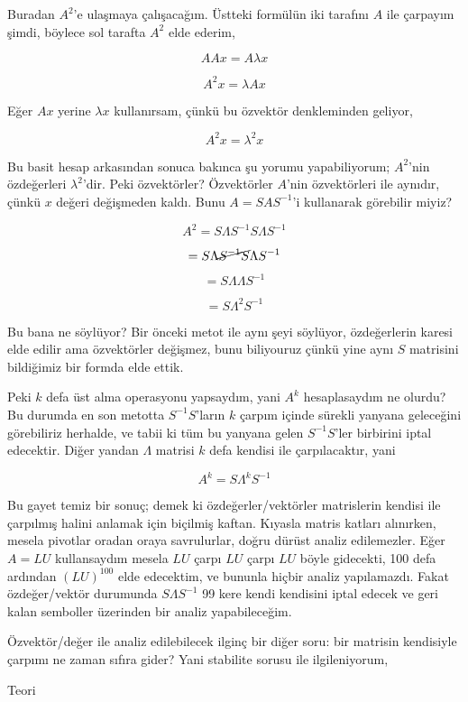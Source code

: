 \documentclass[12pt,fleqn]{article}\usepackage{../../common}
\begin{document}
Buradan $A^2$'e ulaşmaya çalışacağım. Üstteki formülün iki tarafını $A$ ile
çarpayım şimdi, böylece sol tarafta $A^2$ elde ederim,

$$ AAx = A\lambda x $$

$$ A^2x = \lambda A x $$

Eğer $Ax$ yerine $\lambda x$ kullanırsam, çünkü bu özvektör denkleminden geliyor,

$$ A^2x = \lambda^2 x $$

Bu basit hesap arkasından sonuca bakınca şu yorumu yapabiliyorum; $A^2$'nin
özdeğerleri $\lambda^2$'dir. Peki özvektörler? Özvektörler $A$'nin
özvektörleri ile aynıdır, çünkü $x$ değeri değişmeden kaldı. Bunu
$A=SAS^{-1}$'i kullanarak görebilir miyiz?

$$ A^2=S\Lambda S^{-1}S\Lambda S^{-1} $$

$$ =S \Lambda \cancel{S^{-1}S} \Lambda S^{-1} $$

$$ =S \Lambda \Lambda S^{-1} $$

$$ =S \Lambda^2S^{-1} $$

Bu bana ne söylüyor? Bir önceki metot ile aynı şeyi söylüyor, özdeğerlerin
karesi elde edilir ama özvektörler değişmez, bunu biliyouruz çünkü yine
aynı $S$ matrisini bildiğimiz bir formda elde ettik.

Peki $k$ defa üst alma operasyonu yapsaydım, yani $A^k$ hesaplasaydım ne
olurdu? Bu durumda en son metotta $S^{-1}S$'ların $k$ çarpım içinde sürekli
yanyana geleceğini görebiliriz herhalde, ve tabii ki tüm bu yanyana gelen
$S^{-1}S$'ler birbirini iptal edecektir. Diğer yandan $\Lambda$ matrisi
$k$ defa kendisi ile çarpılacaktır, yani

$$ A^k = S\Lambda^k S^{-1} $$

Bu gayet temiz bir sonuç; demek ki özdeğerler/vektörler matrislerin kendisi
ile çarpılmış halini anlamak için biçilmiş kaftan. Kıyasla matris katları
alınırken, mesela pivotlar oradan oraya savrulurlar, doğru dürüst analiz
edilemezler. Eğer $A=LU$ kullansaydım mesela $LU$ çarpı $LU$ çarpı $LU$
böyle gidecekti, 100 defa ardından $(LU)^{100}$ elde edecektim, ve bununla
hiçbir analiz yapılamazdı. Fakat özdeğer/vektör durumunda $S\Lambda S^{-1}$
99 kere kendi kendisini iptal edecek ve geri kalan semboller üzerinden bir
analiz yapabileceğim.

Özvektör/değer ile analiz edilebilecek ilginç bir diğer soru: bir matrisin
kendisiyle çarpımı ne zaman sıfıra gider? Yani stabilite sorusu ile
ilgileniyorum, 

Teori
\end{document}
